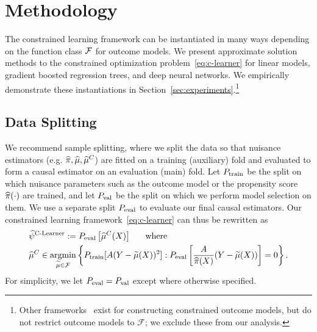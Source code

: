 \section{Methodology}
\label{sec:methodology}

The constrained learning framework can be instantiated in many ways depending on the function class $\mathcal{F}$ for outcome models. %
We 
present approximate solution methods to the constrained optimization problem~\eqref{eq:c-learner}
for linear models, gradient boosted regression trees, and deep neural networks. We empirically demonstrate these instantiations in Section~\ref{sec:experiments}.\footnote{Other frameworks~\citep{Nabi2024StatisticalLF} exist for constructing constrained outcome models, but do not restrict outcome models to $\mathcal F$; we exclude these from our analysis.}

\subsection{Data Splitting}
\label{sec:data_splitting}
We recommend sample splitting, where we split the data so
that nuisance estimators (e.g. $\widehat{\pi}, \widehat{\mu}, \widehat{\mu}^C$) are fitted on a training (auxiliary) fold and evaluated to form a
causal estimator on an evaluation (main) fold. 
Let $P_{\rm train}$ be the split on which nuisance parameters
such as the outcome model or the propensity score $\widehat{\pi}(\cdot)$ are trained, and let $P_{\rm val}$ be the split on which we perform model selection on them. 
We use a separate split $P_{\rm eval}$ to evaluate
our final causal estimators. %
Our constrained learning framework~\eqref{eq:c-learner} can thus be rewritten as
\vspace{-.2cm}
\begin{align}
& \widehat{\psi}^{\textrm {C-Learner}} := 
P_{\rm eval}\left[
\widehat{\mu}^C(X)
\right]~~~~~\mbox{where}  \nonumber\\
\label{eq:c-learner-datasets}
& \widehat{\mu}^C\in \mathop{\rm argmin}_{\widetilde{\mu}\in\mathcal F} \left\{
P_{\rm train}[ A (Y - \widetilde{\mu}(X))^2] : P_{\rm eval}
\left[\frac{A}{\widehat{\pi}(X)}
(Y-\widetilde{\mu}(X))\right]=0
\right\}.
\end{align}
For simplicity, we let $P_{\rm eval}=P_{\rm val}$ except where otherwise specified. 

